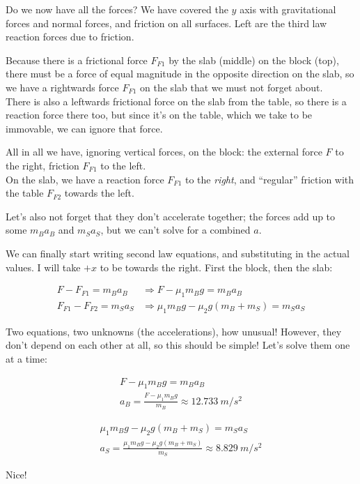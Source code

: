 \documentclass[8.01x]{subfiles}
\begin{document}
Do we now have all the forces? We have covered the $y$ axis with gravitational forces and normal forces, and friction on all surfaces. Left are the third law reaction forces due to friction.

Because there is a frictional force $F_{F1}$ by the slab (middle) on the block (top), there must be a force of equal magnitude in the opposite direction on the slab, so we have a rightwards force $F_{F1}$ on the slab that we must not forget about.\\
There is also a leftwards frictional force on the slab from the table, so there is a reaction force there too, but since it's on the table, which we take to be immovable, we can ignore that force.

All in all we have, ignoring vertical forces, on the block: the external force $F$ to the right, friction $F_{F1}$ to the left.\\
On the slab, we have a reaction force $F_{F1}$ to the \emph{right}, and ``regular'' friction with the table $F_{F2}$ towards the left.

Let's also not forget that they don't accelerate together; the forces add up to some $m_B a_B$ and $m_S a_S$, but we can't solve for a combined $a$.

We can finally start writing second law equations, and substituting in the actual values. I will take $+x$ to be towards the right. First the block, then the slab:

\begin{align}
F - F_{F1} = m_B a_B &\Rightarrow F - \mu_1 m_B g = m_B a_B\\
F_{F1} - F_{F2} = m_S a_S &\Rightarrow \mu_1 m_B g - \mu_2 g(m_B + m_S) = m_S a_S
\end{align}

Two equations, two unknowns (the accelerations), how unusual! However, they don't depend on each other at all, so this should be simple! Let's solve them one at a time:

\begin{align}
F - \mu_1 m_B g = m_B a_B\\
a_B = \frac{F - \mu_1 m_B g}{m_B} \approx \SI{12.733}{m/s^2}
\end{align}

\begin{align}
\mu_1 m_B g - \mu_2 g(m_B + m_S) = m_S a_S\\
a_S = \frac{\mu_1 m_B g - \mu_2 g(m_B + m_S)}{m_S} \approx \SI{8.829}{m/s^2}
\end{align}

Nice!
\end{document}
